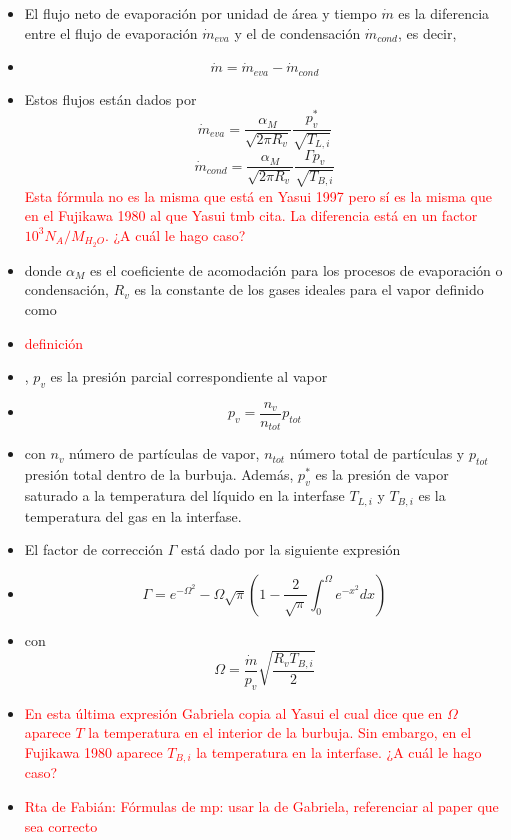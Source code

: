 \documentclass[aps,prb,twocolumn,superscriptaddress,floatfix,longbibliography,10pt]{revtex4-2}
\newif\ifptitle
\newif\ifpnumber
\newcounter{para}
\newcommand\ptitle[1]{\par\refstepcounter{para}
{\ifpnumber{\noindent\textcolor{lightgray}{\textbf{\thepara}}\indent}\fi}
{\ifptitle{\textbf{[{#1}]}}\fi}}
\begin{document}
\ptitle{Definición de $\dot{m}$}
\begin{itemize}
  \item El flujo neto de evaporación por unidad de área y tiempo $\dot{m}$ es la diferencia entre el flujo de evaporación $\dot{m}_{eva}$ y el de condensación $\dot{m}_{cond}$, es decir,
  \item \[\dot{m} = \dot{m}_{eva} - \dot{m}_{cond} \]
  \item Estos flujos están dados por
  \[\dot{m}_{eva} = \frac{\alpha_M}{\sqrt{2 \pi R_v}} \frac{p_v^*}{\sqrt{T_{L,i}}} \]
  \[\dot{m}_{cond} = \frac{\alpha_M}{\sqrt{2 \pi R_v}} \frac{\Gamma p_v}{\sqrt{T_{B,i}}}  \]
  \textcolor{red}{Esta fórmula no es la misma que está en Yasui 1997 pero sí es la misma que en el Fujikawa 1980 al que Yasui tmb cita. La diferencia está en un factor $10^3 N_A / M_{H_2O}$. ¿A cuál le hago caso?}
  \item donde $\alpha_M$ es el coeficiente de acomodación para los procesos de evaporación o condensación, $R_v$ es la constante de los gases ideales para el vapor definido como
  \item \textcolor{red}{definición}
  \item , $p_v$ es la presión parcial correspondiente al vapor
  \item \[p_v = \frac{n_v}{n_{tot}} p_{tot} \]
  \item con $n_v$ número de partículas de vapor, $n_{tot}$ número total de partículas y $p_{tot}$ presión total dentro de la burbuja. Además, $p_v^*$ es la presión de vapor saturado a la temperatura del líquido en la interfase $T_{L,i}$ y $T_{B,i}$ es la temperatura del gas en la interfase.
  \item El factor de corrección $\Gamma$ está dado por la siguiente expresión
  \item \[\Gamma = e^{-\Omega^2} - \Omega \sqrt{\pi} \left ( 1 - \frac{2}{\sqrt{\pi}} \int_0^{\Omega} e^{-x^2} dx \right ) \]
  \item con \[\Omega = \frac{\dot{m}}{p_v} \sqrt{\frac{R_v T_{B,i}}{2}}\]
  \item \textcolor{red}{En esta última expresión Gabriela copia al Yasui el cual dice que en $\Omega$ aparece $T$ la temperatura en el interior de la burbuja. Sin embargo, en el Fujikawa 1980 aparece $T_{B,i}$ la temperatura en la interfase. ¿A cuál le hago caso?}
  \item \textcolor{red}{Rta de Fabián: Fórmulas de mp: usar la de Gabriela, referenciar al paper que sea correcto}
\end{itemize}
\end{document}
